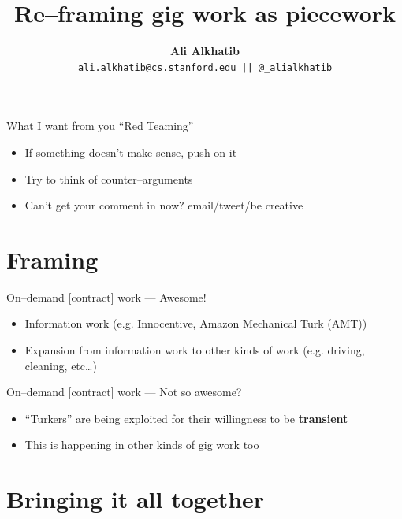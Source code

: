 \documentclass{beamer}
\title{Re--framing gig work as piecework}
\author{\textbf{Ali Alkhatib} \\
\texttt{ \href{mailto:ali.alkhatib@cs.stanford.edu}{ali.alkhatib@cs.stanford.edu} ||
         \href{http://twitter.com/_alialkhatib}{@\_alialkhatib} }}
\date{\usdate{\formatdate{27}{7}{2016}}}
\begin{document}
\begin{frame}
\titlepage
\end{frame}


\begin{frame}{What I want from you}
``Red Teaming''
  \begin{itemize}%
    \item If something doesn't make sense, push on it
    \item Try to think of counter--arguments
    \item Can't get your comment in now? email/tweet/be creative
  \end{itemize}
\end{frame}

\section{Framing}

\begin{frame}{On--demand [contract] work --- Awesome!}
  \begin{itemize}%
    \item Information work
      (e.g. Innocentive, Amazon Mechanical Turk (AMT))
        \cite{bernsteinSoylent,CrowdsourcingUserStudies,paolacci2010running}
    \item Expansion from information work to other kinds of work
      (e.g. driving, cleaning, etc\dots)
        \cite{zaarlyOfficial,uberOfficial}
  \end{itemize}
\end{frame}


\begin{frame}{On--demand [contract] work --- Not so awesome?}
    \begin{itemize}[<+- | alert@+>]
      \item ``Turkers'' are being exploited for their willingness to be \textbf{transient}
        \cite{turkopticon,dynamo}
      \item This is happening in other kinds of gig work too
        \cite{leakedUber,uberSuit,uberAlgorithm}
    \end{itemize}
\end{frame}

\section{Bringing it all together}
\end{document}
